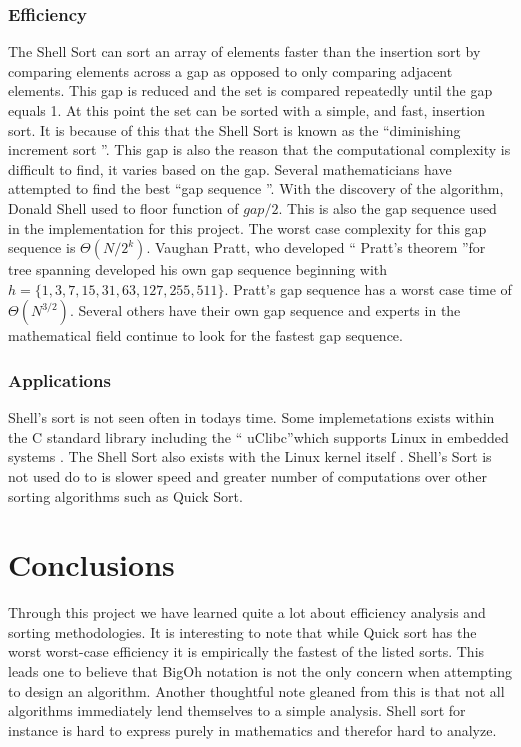 \documentclass{article}
\begin{document}
    \subsubsection{Efficiency}
        The Shell Sort can sort an array of elements faster than the insertion
        sort by comparing elements across a gap as opposed to only comparing
        adjacent elements. This gap is reduced and the set is compared
        repeatedly until the gap equals 1. At this point the set can be sorted
        with a simple, and fast, insertion sort. It is because of this that the
        Shell Sort is known as the \textquotedblleft diminishing increment sort
        \textquotedblright \cite{education}. This gap is also the reason that
        the computational complexity is difficult to find, it varies based on
        the gap. Several mathematicians have attempted to find the best
        \textquotedblleft gap sequence \textquotedblright. With the discovery
        of the algorithm, Donald Shell used to floor function of $gap / 2$.
        This is also the gap sequence used in the implementation for this
        project. The worst case complexity for this gap sequence is
        $\Theta (N/2^k)$. Vaughan Pratt, who developed \textquotedblleft
        Pratt's theorem \textquotedblright for tree spanning developed his own
        gap sequence beginning with $h= \{ 1, 3, 7, 15, 31, 63, 127, 255, 511
        \}$. Pratt's gap sequence has a worst case time of $\Theta (N^{3/2})$.
        Several others have their own gap sequence and experts in the
        mathematical field continue to look for the fastest gap
        sequence\cite{princton}.\\
    \subsubsection{Applications}
        Shell's sort is not seen often in todays time. Some implemetations 
        exists within the C standard library including the \textquotedblleft 
        uClibc\textquotedblright which supports Linux in embedded systems
        \cite{uClibc}. The Shell Sort also exists with the Linux kernel itself
        \cite{kernel}. Shell's Sort is not used do to is slower speed and 
        greater number of computations over other sorting algorithms such as 
        Quick Sort.\\
\section{Conclusions}
Through this project we have learned quite a lot about efficiency analysis and
sorting methodologies. It is interesting to note that while Quick sort has the
worst worst-case efficiency it is empirically the fastest of the listed sorts.
This leads one to believe that BigOh notation is not the only concern when
attempting to design an algorithm. Another thoughtful note gleaned from this
is that not all algorithms immediately lend themselves to a simple analysis.
Shell sort for instance is hard to express purely in mathematics and therefor
hard to analyze.
\end{document}
